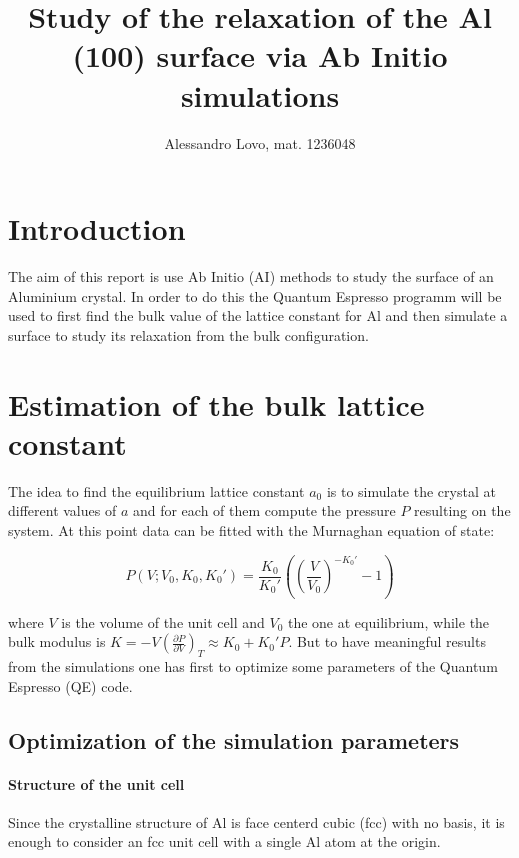 \documentclass[a4paper, 11pt]{article}
\begin{document}
\title{Study of the relaxation of the Al (100) surface via Ab Initio simulations}
\author{Alessandro Lovo, mat. 1236048}

\maketitle

\section{Introduction}
  The aim of this report is use Ab Initio (AI) methods to study the surface of an Aluminium crystal. In order to do this the Quantum Espresso \cite{rif:QE} programm will be used to first find the bulk value of the lattice constant for Al and then simulate a surface to study its relaxation from the bulk configuration.

\section{Estimation of the bulk lattice constant}
  The idea to find the equilibrium lattice constant $a_0$ is to simulate the crystal at different values of $a$ and for each of them compute the pressure $P$ resulting on the system. At this point data can be fitted with the Murnaghan equation of state:

  \begin{equation*}
    P(V;V_0,K_0,K_0') = \frac{K_0}{K_0'}\left(\left(\frac{V}{V_0} \right)^{-K_0'} - 1 \right)
  \end{equation*}

  where $V$ is the volume of the unit cell and $V_0$ the one at equilibrium, while the bulk modulus is $K = -V \left(\frac{\partial P}{\partial V}\right)_T \approx K_0 + K_0'P$.
  But to have meaningful results from the simulations one has first to optimize some parameters of the Quantum Espresso (QE) code.

  \subsection{Optimization of the simulation parameters}
    \paragraph{Structure of the unit cell}
      Since the crystalline structure of Al is face centerd cubic (fcc) with no basis, it is enough to consider an fcc unit cell with a single Al atom at the origin.
\end{document}
